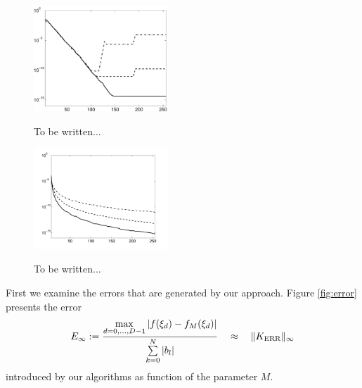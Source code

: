 \documentclass[11pt,a4paper,twoside,bibtotoc]{scrartcl}
\theoremstyle{plain}
\theoremstyle{definition}
\theoremstyle{remark}
\newcommand{\fun}[2]{\ensuremath{#1{\hspace{-0.4ex}}\left(#2\right)}}
\numberwithin{equation}{section}
\numberwithin{table}{section}
\numberwithin{figure}{section}
\begin{document}
\begin{figure}[tb]
  \centering
  {\includegraphics[width=0.45\textwidth]{images/threshold_test}}\hfill
  \caption{To be written...}
  \label{Figure:PoissonTest}
\end{figure}

\begin{figure}[tb]
  \centering
  {\includegraphics[width=0.45\textwidth]{images/locsupp_lambda_test}}\hfill
  \caption{To be written...}
  \label{Figure:PoissonTest}
\end{figure}
First we examine the errors that are generated by our approach.
Figure \ref{fig:error} presents the error
\[
E_{\infty}:=
 \frac{\max\limits_{d=0,\ldots,D-1}\left|\fun{f}{\xi_{d}}-
 \fun{f_{M}}{\xi_{d}}\right|}{\sum\limits_{k=0}^N 
 |b_l|} \quad \approx \quad \|K_{\text{ERR}}\|_{\infty}
\]
introduced by our algorithms as function of the parameter $M$.
\end{document}
